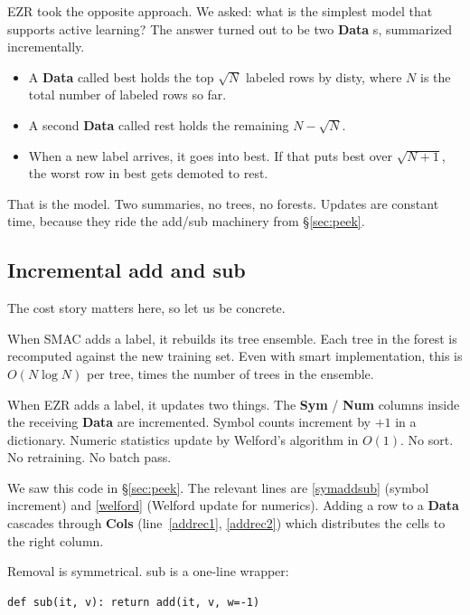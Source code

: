 \documentclass[AMA,STIX2COL]{WileyNJDv5}
\newcommand{\IT}{{\sffamily EZR}}
\newcommand{\cls}[1]{%
  \setlength{\fboxsep}{1.5pt}%
  \colorbox{clsbg}{\sffamily\bfseries{#1}}%
}
\begin{document}
\IT{} took the opposite approach. We asked: what is the
simplest model that supports active learning? The answer turned
out to be two \cls{Data}s, summarized incrementally.

\begin{itemize}
\item A \cls{Data} called \textsf{best} holds the top $\sqrt{N}$
labeled rows by \textsf{disty}, where $N$ is the total number of
labeled rows so far.
\item A second \cls{Data} called \textsf{rest} holds the
remaining $N - \sqrt{N}$.
\item When a new label arrives, it goes into \textsf{best}. If
that puts \textsf{best} over $\sqrt{N+1}$, the worst row in
\textsf{best} gets demoted to \textsf{rest}.
\end{itemize}

That is the model. Two summaries, no trees, no forests. Updates
are constant time, because they ride the \textsf{add}/\textsf{sub}
machinery from \S\ref{sec:peek}.

\subsection{Incremental \textsf{add} and \textsf{sub}}

The cost story matters here, so let us be concrete.

When SMAC adds a label, it rebuilds its tree ensemble. Each
tree in the forest is recomputed against the new training set.
Even with smart implementation, this is $O(N \log N)$ per tree,
times the number of trees in the ensemble.

When \IT{} adds a label, it updates two things. The
\cls{Sym}/\cls{Num} columns inside the receiving \cls{Data} are
incremented. Symbol counts increment by $+1$ in a dictionary.
Numeric statistics update by Welford's algorithm in $O(1)$. No
sort. No retraining. No batch pass.

We saw this code in \S\ref{sec:peek}. The relevant lines are
\ref{symaddsub} (symbol increment) and \ref{welford} (Welford
update for numerics). Adding a row to a \cls{Data} cascades
through \cls{Cols} (line~\ref{addrec1}, \ref{addrec2}) which
distributes the cells to the right column.

Removal is symmetrical. \textsf{sub} is a one-line wrapper:

\begin{verbatim}
def sub(it, v): return add(it, v, w=-1)
\end{verbatim}
\end{document}
